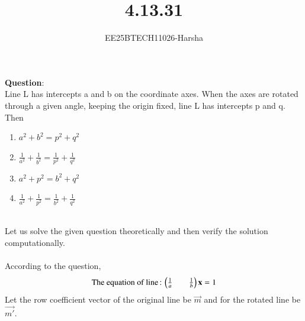 \documentclass[journal]{IEEEtran}
\begin{document}

\vspace{3cm}

\title{4.13.31}
\author{EE25BTECH11026-Harsha}
 \maketitle
{\let\newpage\relax\maketitle}

\renewcommand{\thefigure}{\theenumi}
\renewcommand{\thetable}{\theenumi}
\setlength{\intextsep}{10pt} %


\renewcommand{\thetable}{\theenumi}

\textbf{Question}:\\
Line L has intercepts a and b on the coordinate axes. When the axes are rotated
through a given angle, keeping the origin fixed, line L has intercepts p and q. Then
\begin{multicols}{4}
\begin{enumerate}
    \item $a^2+b^2=p^2+q^2$
    \item $\frac{1}{a^2}+\frac{1}{b^2}=\frac{1}{p^2}+\frac{1}{q^2}$
    \item $a^2+p^2=b^2+q^2$
    \item $\frac{1}{a^2}+\frac{1}{p^2}=\frac{1}{b^2}+\frac{1}{q^2}$
\end{enumerate}
\end{multicols}
\solution \\
Let us solve the given question theoretically and then verify the solution computationally.\\
\\
According to the question,\\
\begin{align}
    \text{The equation of line\,:\,}\begin{pmatrix}\frac{1}{a}&&\frac{1}{b}\end{pmatrix}\mathbf{x}=1
\end{align} 
Let the row coefficient vector of the original line be $\vec{m}$ and for the rotated line be $\vec{m'}$.
\end{document}
